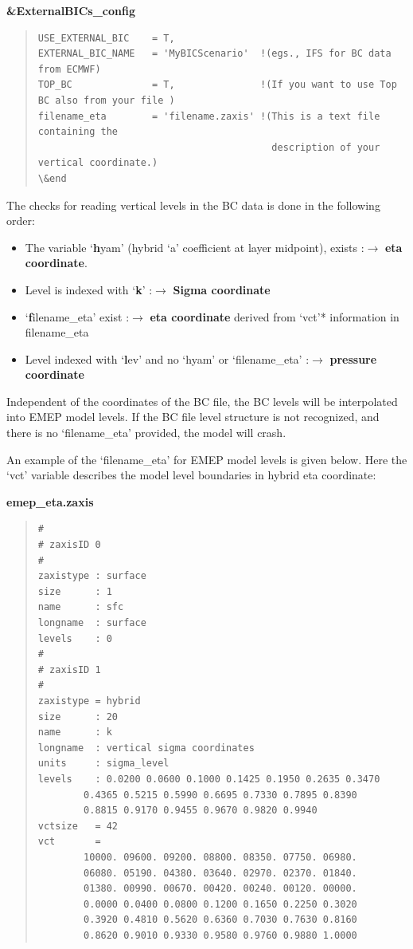 \documentclass[a4paper,12pt]{report}
\begin{document}
{\bf \&ExternalBICs\_config}
\begin{quote}
\begin{verbatim}
USE_EXTERNAL_BIC 	= T,
EXTERNAL_BIC_NAME 	= 'MyBICScenario'  !(egs., IFS for BC data from ECMWF) 
TOP_BC 		    	= T,   		       !(If you want to use Top BC also from your file )
filename_eta		= 'filename.zaxis' !(This is a text file containing the 
                                         description of your vertical coordinate.)			
\&end
\end{verbatim}
\end{quote}


The checks for reading vertical levels in the BC data is done in the following order:
\begin{itemize}
\item The variable `{\textbf hyam}' (hybrid `a' coefficient at layer midpoint), exists :${\rightarrow}$ {\bf eta coordinate}. 
\item Level is indexed with `{\textbf k}'  :${\rightarrow}$ {\bf Sigma coordinate}
\item `{\textbf filename\_eta}' exist :${\rightarrow}$ {\bf eta coordinate} derived from `vct'*  information in filename\_eta
\item Level indexed with `{\textbf lev}' and no `hyam' or `filename\_eta' :${\rightarrow}$ {\bf pressure coordinate}	
\end{itemize}


Independent of the coordinates of the BC file, the BC levels will be interpolated into EMEP model levels.  If the BC file level structure is not recognized, and there 	is no `filename\_eta' provided, the model will crash. 

An example of the `filename\_eta' for EMEP model levels is given below. Here the `vct' variable describes the model level boundaries in hybrid eta coordinate: 	

{\bf emep\_eta.zaxis}
\begin{quote}
\begin{verbatim}
# 
# zaxisID 0 
# 
zaxistype : surface 
size      : 1 
name      : sfc 
longname  : surface 
levels    : 0 
# 
# zaxisID 1 
# 
zaxistype = hybrid 
size      : 20 
name      : k 
longname  : vertical sigma coordinates 
units     : sigma_level 
levels    : 0.0200 0.0600 0.1000 0.1425 0.1950 0.2635 0.3470 
	    0.4365 0.5215 0.5990 0.6695 0.7330 0.7895 0.8390 
	    0.8815 0.9170 0.9455 0.9670 0.9820 0.9940 
vctsize   = 42 
vct       =
	    10000. 09600. 09200. 08800. 08350. 07750. 06980. 
	    06080. 05190. 04380. 03640. 02970. 02370. 01840. 
	    01380. 00990. 00670. 00420. 00240. 00120. 00000. 
	    0.0000 0.0400 0.0800 0.1200 0.1650 0.2250 0.3020 
	    0.3920 0.4810 0.5620 0.6360 0.7030 0.7630 0.8160 
	    0.8620 0.9010 0.9330 0.9580 0.9760 0.9880 1.0000 
\end{verbatim}
\end{quote}
\end{document}
